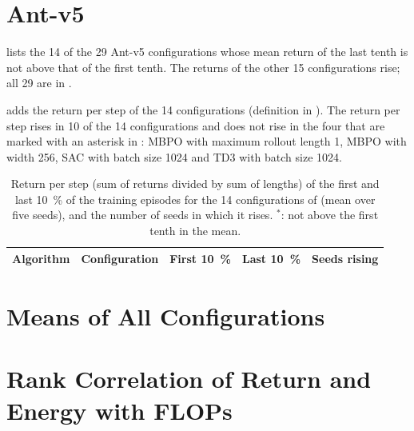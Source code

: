 \section{Ant-v5}\label{sec:app-learn-ant}

 lists the \num{14} of the \num{29} Ant-v5 configurations whose mean return of the last tenth is not above that of the first tenth.
The returns of the other \num{15} configurations rise; all \num{29} are in .


 adds the return per step of the \num{14} configurations (definition in ).
The return per step rises in \num{10} of the \num{14} configurations and does not rise in the four that are marked with an asterisk in : MBPO with maximum rollout length \num{1}, MBPO with width \num{256}, SAC with batch size \num{1024} and TD3 with batch size \num{1024}.

\begin{table}[tb]
  \centering
  \caption{Return per step (sum of returns divided by sum of lengths) of the first and last \SI{10}{\percent} of the training episodes for the \num{14} configurations of  (mean over five seeds), and the number of seeds in which it rises.
    $^\ast$: not above the first tenth in the mean.}
  \label{tab:app-learning-perstep}
  \small
  \begin{tabular}{llrrr}
    \toprule
    Algorithm & Configuration & First \SI{10}{\percent} & Last \SI{10}{\percent} & Seeds rising \\
    \midrule
    \bottomrule
  \end{tabular}
\end{table}

\section{Means of All Configurations}\label{sec:app-learn-means}


\section{Rank Correlation of Return and Energy with FLOPs}\label{sec:app-learn-spearman}

